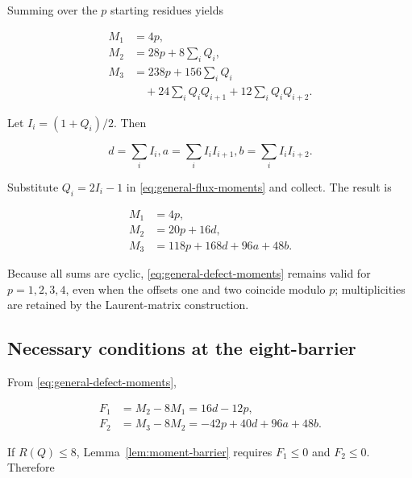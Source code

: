 Summing over the \(p\) starting residues yields

\begin{equation}
\label{eq:general-flux-moments}
\begin{aligned}
M_{1}&=4p, \\
M_{2}&=28p+8 \sum_i Q_i, \\
M_{3}&=238p+156 \sum_i Q_i \\
&\quad +24 \sum_i Q_iQ_{i+1}+12 \sum_i Q_iQ_{i+2}.
\end{aligned}
\end{equation}

Let \(I_i=(1+Q_i)/2\). Then

\begin{equation}
d=\sum_i I_i,       a=\sum_i I_iI_{i+1},       b=\sum_i I_iI_{i+2}.
\end{equation}

Substitute \(Q_i=2I_i-1\) in \eqref{eq:general-flux-moments} and collect. The result is

\begin{equation}
\label{eq:general-defect-moments}
\begin{aligned}
M_{1}&=4p, \\
M_{2}&=20p+16d, \\
M_{3}&=118p+168d+96a+48b.
\end{aligned}
\end{equation}

Because all sums are cyclic, \eqref{eq:general-defect-moments} remains valid for \(p=1,2,3,4\), even when
the offsets one and two coincide modulo \(p\); multiplicities are retained by
the Laurent-matrix construction.

\subsection{Necessary conditions at the eight-barrier}

From \eqref{eq:general-defect-moments},

\begin{equation}
\label{eq:general-excesses}
\begin{aligned}
F_{1}&=M_{2}-8M_{1}=16d-12p, \\
F_{2}&=M_{3}-8M_{2}=-42p+40d+96a+48b.
\end{aligned}
\end{equation}

If \(R(Q)\leq 8\), Lemma~\ref{lem:moment-barrier} requires \(F_{1}\leq 0\) and \(F_{2}\leq 0\). Therefore

